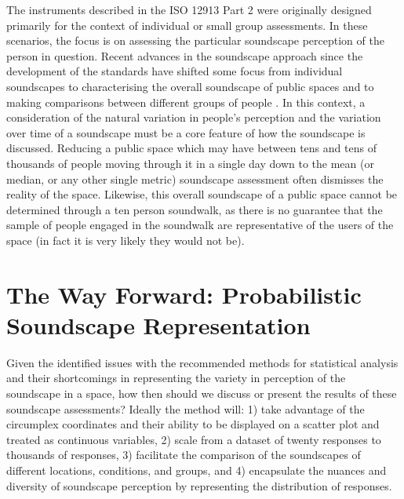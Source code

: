 The instruments described in the ISO 12913 Part 2 \citep{ISO12913Part2} were originally designed primarily for the context of individual or small group assessments. In these scenarios, the focus is on assessing the particular soundscape perception of the person in question. Recent advances in the soundscape approach since the development of the standards have shifted some focus from individual soundscapes to characterising the overall soundscape of public spaces \citep{Mitchell2020Soundscape} and to making comparisons between different groups of people \citep{Jeon2018cross}. In this context, a consideration of the natural variation in people's perception and the variation over time of a soundscape must be a core feature of how the soundscape is discussed. Reducing a public space which may have between tens and tens of thousands of people moving through it in a single day down to the mean (or median, or any other single metric) soundscape assessment often dismisses the reality of the space. Likewise, this overall soundscape of a public space cannot be determined through a ten person soundwalk, as there is no guarantee that the sample of people engaged in the soundwalk are representative of the users of the space (in fact it is very likely they would not be).


\section{The Way Forward: Probabilistic Soundscape Representation}
Given the identified issues with the recommended methods for statistical analysis and their shortcomings in representing the variety in perception of the soundscape in a space, how then should we discuss or present the results of these soundscape assessments? Ideally the method will: 1) take advantage of the circumplex coordinates and their ability to be displayed on a scatter plot and treated as continuous variables, 2) scale from a dataset of twenty responses to thousands of responses, 3) facilitate the comparison of the soundscapes of different locations, conditions, and groups, and 4) encapsulate the nuances and diversity of soundscape perception by representing the distribution of responses.


